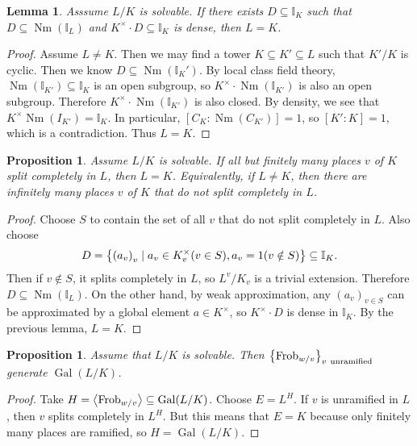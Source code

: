 \documentclass[leqno, openany]{memoir}
\newtheorem{prop}[thm]{Proposition}
\newtheorem{lem}[thm]{Lemma}
\theoremstyle{definition}
\theoremstyle{remark}
\theoremstyle{plain}
\theoremstyle{definition}
\theoremstyle{remark}
\newcommand{\I}{\mathbb{I}}
\DeclareMathOperator{\Gal}{Gal}
\DeclareMathOperator{\Nm}{Nm}
\DeclareMathOperator{\Frob}{Frob}
\begin{document}
\begin{lem}
    Asssume $L/K$ is solvable. If there exists $D \subseteq \I_K$ such that $D \subseteq \Nm(\I_L)$ and $K^{\times} \cdot D \subseteq \I_K$ is dense, then $L = K$.
\end{lem}

\begin{proof}
    Assume $L \neq K$. Then we may find a tower $K \subseteq K' \subseteq L$ such that $K'/K$ is cyclic. Then we know $D \subseteq \Nm(\I_K')$. By local class field theory, $\Nm(\I_{K'}) \subseteq \I_K$ is an open subgroup, so $K^{\times} \cdot \Nm(\I_{K'})$ is also an open subgroup. Therefore $K^{\times} \cdot \Nm(\I_{K'})$ is also closed. By density, we see that $K^{\times} \Nm(I_{K'}) = \I_K$. In particular, $[C_K : \Nm(C_{K'})] = 1$, so $[K':K] = 1$, which is a contradiction. Thus $L = K$.
\end{proof}

\begin{prop}
    Assume $L/K$ is solvable. If all but finitely many places $v$ of $K$ split completely in $L$, then $L = K$. Equivalently, if $L \neq K$, then there are infinitely many places $v$ of $K$ that do not split completely in $L$.
\end{prop}

\begin{proof}
    Choose $S$ to contain the set of all $v$ that do not split completely in $L$. Also choose
    \[ D = \qty{{(a_v)}_v \mid a_v \in K_v^{\times} (v \in S), a_v = 1 (v \notin S)} \subseteq \I_K. \]
    Then if $v \notin S$, it splits completely in $L$, so $L^v / K_v$ is a trivial extension. Therefore $D \subseteq \Nm(\I_L)$. On the other hand, by weak approximation, any ${(a_v)}_{v \in S}$ can be approximated by a global element $a \in K^{\times}$, so $K^{\times} \cdot D$ is dense in $\I_K$. By the previous lemma, $L = K$.
\end{proof}

\begin{prop}
    Assume that $L/K$ is solvable. Then $\qty{\Frob_{w/v}}_{v\ \text{unramified}}$ generate $\Gal(L/K)$.
\end{prop}

\begin{proof}
    Take $H = \ev{\Frob_{w/v}} \subseteq \Gal(L/K)$. Choose $E = L^H$. If $v$ is unramified in $L$, then $v$ splits completely in $L^H$. But this means that $E = K$ because only finitely many places are ramified, so $H = \Gal(L/K)$.
\end{proof}
\end{document}
